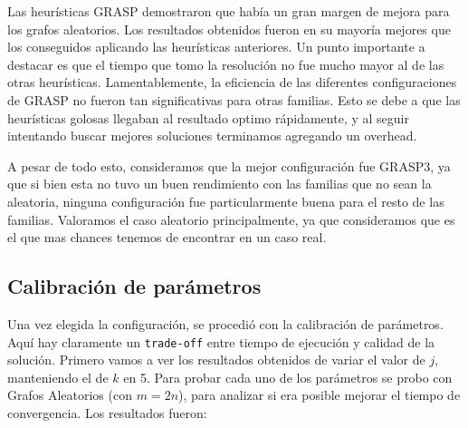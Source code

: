 Las heurísticas GRASP demostraron que había un gran margen de mejora para los grafos aleatorios. Los resultados obtenidos fueron en su mayoría mejores que los conseguidos aplicando las heurísticas anteriores. Un punto importante a destacar es que el tiempo que tomo la resolución no fue mucho mayor al de las otras heurísticas. Lamentablemente, la eficiencia de las diferentes configuraciones de GRASP no fueron tan significativas para otras familias. Esto se debe a que las heurísticas golosas llegaban al resultado optimo rápidamente, y al seguir intentando buscar mejores soluciones terminamos agregando un overhead.

A pesar de todo esto, consideramos que la mejor configuración fue GRASP3, ya que si bien esta no tuvo un buen rendimiento con las familias que no sean la aleatoria, ninguna configuración fue particularmente buena para el resto de las familias. Valoramos el caso aleatorio principalmente, ya que consideramos que es el que mas chances tenemos de encontrar en un caso real.

\subsection{Calibración de parámetros}

Una vez elegida la configuración, se procedió con la calibración de parámetros. Aquí hay claramente un \texttt{trade-off} entre tiempo de ejecución y calidad de la solución. Primero vamos a ver los resultados obtenidos de variar el valor de $j$, manteniendo el de $k$ en 5. Para probar cada uno de los parámetros se probo con Grafos Aleatorios (con $m = 2n$), para analizar si era posible mejorar el tiempo de convergencia. Los resultados fueron:

